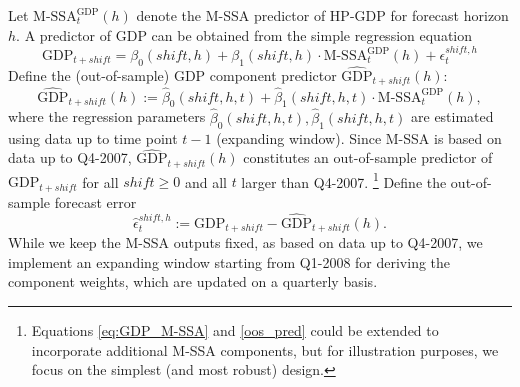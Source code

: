 \documentclass[11pt,a4paper]{article}
\begin{document}
Let $\textrm{M-SSA}^{\textrm{GDP}}_t(h)$ denote the M-SSA predictor of HP-GDP for forecast horizon $h$. A predictor of GDP can be obtained from the simple regression equation
\begin{equation}
\textrm{GDP}_{t+shift}=\beta_0(shift,h)+\beta_1(shift,h) \cdot \textrm{M-SSA}^{\textrm{GDP}}_t(h) + \epsilon_t^{shift,h}
\label{eq:GDP_M-SSA}
\end{equation}
Define the (out-of-sample) GDP component predictor $\hat{\textrm{GDP}}_{t+shift}(h)$:  
\begin{equation}\label{oos_pred}
\hat{\textrm{GDP}}_{t+shift}(h):=\hat{\beta}_0(shift,h,t)+\hat{\beta}_1(shift,h,t) \cdot \textrm{M-SSA}^{\textrm{GDP}}_t(h),
\end{equation}
where the regression parameters $\hat{\beta}_0(shift,h,t),\hat{\beta}_1(shift,h,t)$ are estimated using data up to time point $t-1$ (expanding window). Since M-SSA is based on data up to Q4-2007, $\hat{\textrm{GDP}}_{t+shift}(h)$ constitutes an out-of-sample predictor of $\textrm{GDP}_{t+shift}$ for all $shift\geq 0$ and all $t$ larger than Q4-2007. 
\footnote{Equations \ref{eq:GDP_M-SSA} and \ref{oos_pred} could be extended to incorporate additional M-SSA components, but for illustration purposes, we focus on the simplest (and most robust) design.}
Define the out-of-sample forecast error
\begin{equation}\label{oosfe}
\hat{\epsilon}_t^{shift,h}:={\textrm{GDP}}_{t+shift}-\hat{\textrm{GDP}}_{t+shift}(h).
\end{equation}
While we keep the M-SSA outputs fixed, as based on data up to Q4-2007, we implement an expanding window starting from Q1-2008 for deriving the component weights, which are updated on a quarterly basis. 
\end{document}

